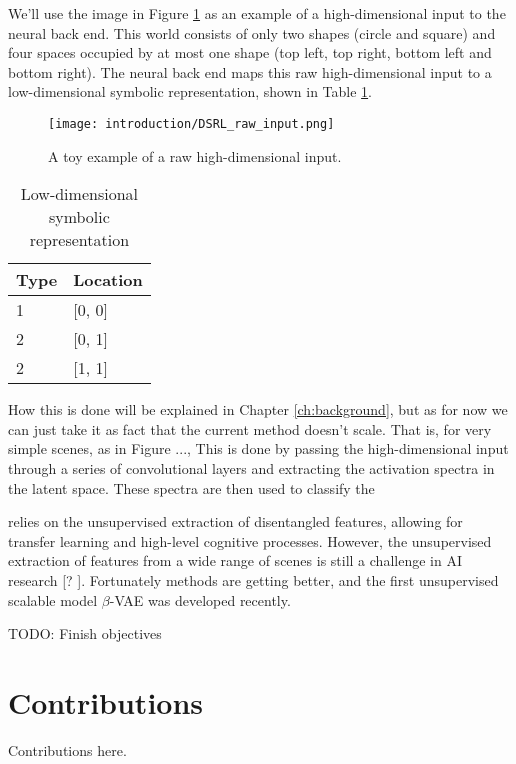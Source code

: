 We'll use the image in Figure \ref{fig:dsrl_raw_input} as an example of a high-dimensional input to the neural back end. This world consists of only two shapes (circle and square) and four spaces occupied by at most one shape (top left, top right, bottom left and bottom right). The neural back end maps this raw high-dimensional input to a low-dimensional symbolic representation, shown in Table \ref{tab:dsrl_symbolic_representation}.

\begin{figure}[h!]
\centering
\texttt{[image: introduction/DSRL\_raw\_input.png]}
\caption{A toy example of a raw high-dimensional input.}
\label{fig:dsrl_raw_input}
\end{figure} 

\begin{table}[]
\centering
\label{tab:dsrl_symbolic_representation}
\begin{tabular}{@{}ll@{}}
\toprule
Type & Location   \\ \midrule
1    & {[}0, 0{]} \\
2    & {[}0, 1{]} \\
2    & {[}1, 1{]} \\ \bottomrule
\end{tabular}
\caption{Low-dimensional symbolic representation}
\end{table}

 How this is done will be explained in Chapter \ref{ch:background}, but as for now we can just take it as fact that the current method doesn't scale. That is, for very simple scenes, as in Figure ...,  This is done by passing the high-dimensional input through a series of convolutional layers and extracting the activation spectra in the latent space. These spectra are then used to classify the  

 relies on the unsupervised extraction of disentangled features, allowing for transfer learning and high-level cognitive processes. However, the unsupervised extraction of features from a wide range of scenes is still a challenge in AI research [? ]. Fortunately methods are getting better, and the first unsupervised scalable model $\beta$-VAE was developed recently.
 
 TODO: Finish objectives

\section{Contributions}

Contributions here.